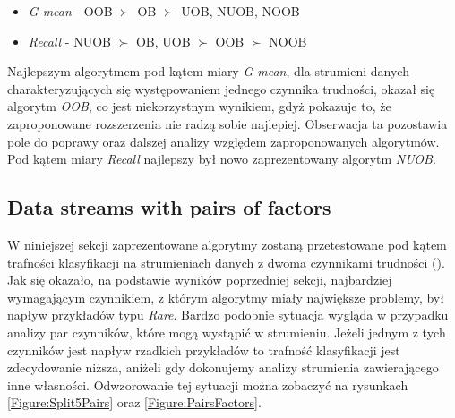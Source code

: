 \begin{itemize}
    \item \textit{G-mean} - OOB $\succ$ OB $\succ$ UOB, NUOB, NOOB
    \item \textit{Recall} - NUOB $\succ$ OB, UOB $\succ$ OOB $\succ$ NOOB
\end{itemize}

\noindent Najlepszym algorytmem pod kątem miary \textit{G-mean}, dla strumieni danych charakteryzujących się występowaniem jednego czynnika trudności, okazał się algorytm \textit{OOB}, co jest niekorzystnym wynikiem, gdyż pokazuje to, że zaproponowane rozszerzenia nie radzą sobie najlepiej. Obserwacja ta pozostawia pole do poprawy oraz dalszej analizy względem zaproponowanych algorytmów. Pod kątem miary \textit{Recall} najlepszy był nowo zaprezentowany algorytm \textit{NUOB}.

\subsection{Data streams with pairs of factors}

\noindent W niniejszej sekcji zaprezentowane algorytmy zostaną przetestowane pod kątem trafności klasyfikacji na strumieniach danych z dwoma czynnikami trudności (). Jak się okazało, na podstawie wyników poprzedniej sekcji, najbardziej wymagającym czynnikiem, z którym algorytmy miały największe problemy, był napływ przykładów typu \textit{Rare}. Bardzo podobnie sytuacja wygląda w przypadku analizy par czynników, które mogą wystąpić w strumieniu. Jeżeli jednym z tych czynników jest napływ rzadkich przykładów to trafność klasyfikacji jest zdecydowanie niższa, aniżeli gdy dokonujemy analizy strumienia zawierającego inne własności. Odwzorowanie tej sytuacji można zobaczyć na rysunkach \ref{Figure:Split5Pairs} oraz \ref{Figure:PairsFactors}.

